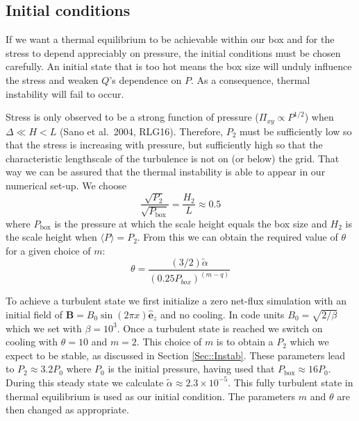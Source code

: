 \documentclass[useAMS]{mn2e}
\begin{document}
\subsection{Initial conditions}  

If we want a thermal equilibrium to be achievable within our box and
for the stress to depend appreciably on pressure, the initial
conditions must be chosen carefully. An initial state that is too hot
means the box size will unduly influence the stress and weaken
$Q$'s dependence on $P$. 
As a consequence, thermal instability will fail to occur.

Stress is only observed to be
a strong function of pressure ($\Pi_{xy}\propto P^{1/2}$) 
when $\Delta\ll H<L$  (Sano et al.~2004,
RLG16). Therefore, $P_{2}$ must be sufficiently low so that the stress is
increasing with pressure, but sufficiently high so that
the characteristic lengthscale of the turbulence is not on (or below)
the grid. 
That way we can be assured that the thermal instability is able to
appear in our numerical set-up. We choose
\begin{equation}
\frac{\sqrt{P_{2}}}{\sqrt{P_{\text{box}}}}=\frac{H_{2}}{L}\approx 0.5
\label{eqn::P0Peqa}
\end{equation}
where $P_{\text{box}}$ is the pressure at which the scale height equals the
box size and $H_{2}$ is the scale height when $\langle P\rangle
=P_{2}$. From this we can obtain the required value of $\theta$ for a given choice of $m$:
\begin{equation}
\theta=\frac{(3/2)\tilde{\alpha}}{(0.25P_{box})^{(m-q)}}
\end{equation}



To achieve a turbulent state we first initialize a zero net-flux
simulation with an initial field of $\boldsymbol{B}=B_{0}\sin(2\pi
x)\mathbf{\hat{e}}_z$ and no cooling. In code units
$B_{0}=\sqrt{2/\beta}$ which we set with $\beta=10^{3}$. Once a
turbulent state is reached we switch on cooling with $\theta=10$ and
$m=2$. This choice of $m$ is to obtain a $P_{2}$ which we expect to be
stable, as discussed in Section \ref{Sec::Instab}. These parameters
lead to $P_{2}\approx 3.2P_{0}$ where $P_{0}$ is the initial pressure,
having used that $P_{\text{box}}\approx 16P_{0}$. During this steady state we
calculate $\tilde{\alpha}\approx2.3\times10^{-5}$.  
This fully turbulent state in thermal equilibrium is used as our
initial condition. The parameters $m$ and $\theta$ are then changed as
appropriate.
\end{document}
